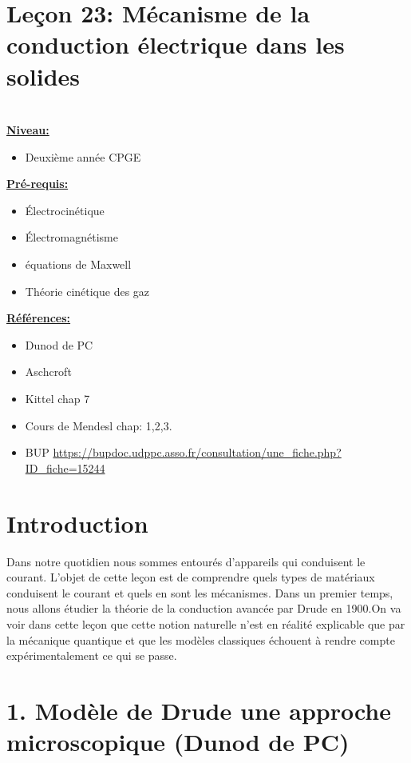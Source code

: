 \documentclass[french, a4paper, 10pt, twocolumn, landscape]{article}
\begin{document}
\clearpage

\section*{Leçon 23: Mécanisme de la conduction électrique dans les solides}

\hrulefill\\

\noindent\underline{\textbf{Niveau:}} 
\begin{itemize}
    \item Deuxième année CPGE
\end{itemize}

\noindent\underline{\textbf{Pré-requis:}}
\begin{itemize}
    \item Électrocinétique
    \item Électromagnétisme
    \item équations de Maxwell
    \item Théorie cinétique des gaz
\end{itemize}

\noindent\underline{\textbf{Références:}}

\begin{itemize}
\item Dunod de PC
\item Aschcroft
\item Kittel chap 7
\item Cours de Mendesl chap: 1,2,3.
\item BUP \url{https://bupdoc.udppc.asso.fr/consultation/une_fiche.php?ID_fiche=15244}
\end{itemize}

\hrulefill

\section*{Introduction}

Dans notre quotidien nous sommes entourés d'appareils qui conduisent le courant. L'objet de cette leçon est de comprendre quels types de matériaux conduisent le courant et quels en sont les mécanismes. Dans un premier temps, nous allons étudier la théorie de la conduction avancée par Drude en 1900.On va voir dans cette leçon que cette notion naturelle n’est en réalité explicable que par
la mécanique quantique et que les modèles classiques échouent à rendre compte expérimentalement ce qui se passe.

\section*{1. Modèle de Drude une approche microscopique (Dunod de PC)}
\end{document}
